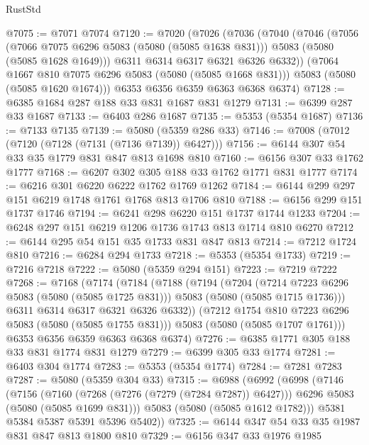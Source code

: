 \begin{lexlean}{RustStd}
\begin{coremodule}
{\begin{coremodule}
{{{{{@7075 := @7071 @7074
@7120 := @7020
    (@7026
      (@7036
        (@7040
          (@7046
            (@7056
              (@7066 @7075 @6296 @5083 (@5080 (@5085 @1638 @831)))
              @5083
              (@5080 (@5085 @1628 @1649)))
            @6311
            @6314
            @6317
            @6321
            @6326
            @6332))
        (@7064 @1667 @810 @7075 @6296 @5083 (@5080 (@5085 @1668 @831)))
        @5083
        (@5080 (@5085 @1620 @1674)))
      @6353
      @6356
      @6359
      @6363
      @6368
      @6374)
@7128 := @6385 @1684 @287 @188 @33 @831 @1687 @831 @1279
@7131 := @6399 @287 @33 @1687
@7133 := @6403 @286 @1687
@7135 := @5353 (@5354 @1687)
@7136 := @7133 @7135
@7139 := @5080 (@5359 @286 @33)
@7146 := @7008 (@7012 (@7120 (@7128 (@7131 (@7136 @7139)) @6427)))
@7156 := @6144 @307 @54 @33 @35 @1779 @831 @847 @813 @1698 @810
@7160 := @6156 @307 @33 @1762 @1777
@7168 := @6207 @302 @305 @188 @33 @1762 @1771 @831 @1777
@7174 := @6216 @301 @6220 @6222 @1762 @1769 @1262
@7184 := @6144 @299 @297 @151 @6219 @1748 @1761 @1768 @813 @1706 @810
@7188 := @6156 @299 @151 @1737 @1746
@7194 := @6241 @298 @6220 @151 @1737 @1744 @1233
@7204 := @6248 @297 @151 @6219 @1206 @1736 @1743 @813 @1714 @810 @6270
@7212 := @6144 @295 @54 @151 @35 @1733 @831 @847 @813
@7214 := @7212 @1724 @810
@7216 := @6284 @294 @1733
@7218 := @5353 (@5354 @1733)
@7219 := @7216 @7218
@7222 := @5080 (@5359 @294 @151)
@7223 := @7219 @7222
@7268 := @7168
    (@7174
      (@7184
        (@7188
          (@7194
            (@7204
              (@7214 @7223 @6296 @5083 (@5080 (@5085 @1725 @831)))
              @5083
              (@5080 (@5085 @1715 @1736)))
            @6311
            @6314
            @6317
            @6321
            @6326
            @6332))
        (@7212 @1754 @810 @7223 @6296 @5083 (@5080 (@5085 @1755 @831)))
        @5083
        (@5080 (@5085 @1707 @1761)))
      @6353
      @6356
      @6359
      @6363
      @6368
      @6374)
@7276 := @6385 @1771 @305 @188 @33 @831 @1774 @831 @1279
@7279 := @6399 @305 @33 @1774
@7281 := @6403 @304 @1774
@7283 := @5353 (@5354 @1774)
@7284 := @7281 @7283
@7287 := @5080 (@5359 @304 @33)
@7315 := @6988
    (@6992
      (@6998
        (@7146
          (@7156
            (@7160 (@7268 (@7276 (@7279 (@7284 @7287)) @6427)))
            @6296
            @5083
            (@5080 (@5085 @1699 @831)))
          @5083
          (@5080 (@5085 @1612 @1782)))
        @5381
        @5384
        @5387
        @5391
        @5396
        @5402))
@7325 := @6144 @347 @54 @33 @35 @1987 @831 @847 @813 @1800 @810
@7329 := @6156 @347 @33 @1976 @1985
}}}}}
\end{coremodule}}
\end{coremodule}
\end{lexlean}
